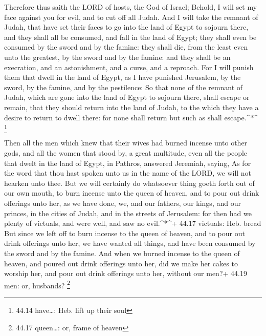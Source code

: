  Therefore thus saith the LORD of hosts, the God of Israel;
Behold, I will set my face against you for evil, and to cut off all
Judah.  And I will take the remnant of Judah, that have set
their faces to go into the land of Egypt to sojourn there, and they
shall all be consumed, and fall in the land of Egypt; they shall even be
consumed by the sword and by the famine: they shall die, from the least
even unto the greatest, by the sword and by the famine: and they shall
be an execration, and an astonishment, and a curse, and a reproach.
 For I will punish them that dwell in the land of Egypt, as
I have punished Jerusalem, by the sword, by the famine, and by the
pestilence:  So that none of the remnant of Judah, which
are gone into the land of Egypt to sojourn there, shall escape or
remain, that they should return into the land of Judah, to the which
they have a desire to return to dwell there: for none shall return but
such as shall escape.\^{}*\^{} \footnote{44.14 have\ldots: Heb. lift up
  their soul}

 Then all the men which knew that their wives had burned
incense unto other gods, and all the women that stood by, a great
multitude, even all the people that dwelt in the land of Egypt, in
Pathros, answered Jeremiah, saying,  As for the word that
thou hast spoken unto us in the name of the LORD, we will not hearken
unto thee.  But we will certainly do whatsoever thing goeth
forth out of our own mouth, to burn incense unto the queen of heaven,
and to pour out drink offerings unto her, as we have done, we, and our
fathers, our kings, and our princes, in the cities of Judah, and in the
streets of Jerusalem: for then had we plenty of victuals, and were well,
and saw no evil.\^{}*\^{}+ 44.17 victuals: Heb. bread  But
since we left off to burn incense to the queen of heaven, and to pour
out drink offerings unto her, we have wanted all things, and have been
consumed by the sword and by the famine.  And when we
burned incense to the queen of heaven, and poured out drink offerings
unto her, did we make her cakes to worship her, and pour out drink
offerings unto her, without our men?+ 44.19 men: or, husbands?
\footnote{44.17 queen\ldots: or, frame of heaven}

